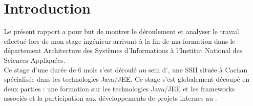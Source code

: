 \chapter*{Introduction}

Le présent rapport a pour but de montrer le déroulement et analyser le travail effectué lors de mon stage ingénieur arrivant à la fin de ma formation dans le département Architecture des Systèmes d'Informations à l'Institut National des Sciences Appliquées.\\

Ce stage d'une durée de 6 mois s'est déroulé au sein d'\ebi{}, une SSII située à Cachan spécialisée dans les technologies Java/JEE. Ce stage s'est globalement découpé en deux parties : une formation sur les technologies Java/JEE et les frameworks associés et la participation aux développements de projets internes au \excilysGroup{}.
